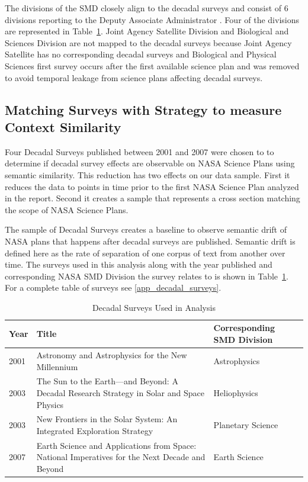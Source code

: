 \documentclass[preprint,12pt]{elsarticle}
\begin{document}
 The divisions of the SMD closely align to the decadal surveys and consist of 6 divisions reporting to the Deputy Associate Administrator \cite{NASA_SMD}. Four of the divisions are represented in Table~\ref{tab:decadals_used}. Joint Agency Satellite Division and Biological and Sciences Division are not mapped to the decadal surveys because Joint Agency Satellite has no corresponding decadal surveys and Biological and Physical Sciences first survey occurs after the first available science plan and was removed to avoid temporal leakage from science plans affecting decadal surveys.  

\subsection{Matching Surveys with Strategy to measure Context Similarity}
Four Decadal Surveys published between 2001 and 2007 were chosen to to determine if decadal survey effects are observable on NASA Science Plans using semantic similarity.  This reduction has two effects on our data sample. First it reduces the data to points in time prior to the first NASA Science Plan analyzed in the report. Second it creates a sample that represents a cross section matching the scope of NASA Science Plans. 

The sample of Decadal Surveys creates a baseline to observe semantic drift of NASA plans that happens after decadal surveys are published. Semantic drift is defined here as the rate of separation of one corpus of text from another over time. The surveys used in this analysis along with the year published and corresponding NASA SMD Division the survey relates to is shown in Table~\ref{tab:decadals_used}. For a complete table of surveys see \ref{app_decadal_surveys}.

\begin{table}[H]
\centering
\begin{tabular}{p{1.2cm} p{7.5cm} p{3.5cm}}
 \hline
 \rowcolor[gray]{0.95}
 \textbf{Year} & \textbf{Title} & \textbf{Corresponding SMD Division} \\ \hline
 2001 & Astronomy and Astrophysics for the New Millennium & Astrophysics \\
 \rowcolor[gray]{0.97}
 2003 & The Sun to the Earth—and Beyond: A Decadal Research Strategy in Solar and Space Physics & Heliophysics \\
 2003 & New Frontiers in the Solar System: An Integrated Exploration Strategy & Planetary  Science \\
 \rowcolor[gray]{0.97}
 2007 & Earth Science and Applications from Space: National Imperatives for the Next Decade and Beyond & Earth Science \\
\end{tabular}
\caption{Decadal Surveys Used in Analysis \cite{Academies_decadal, NASA_sci_strat}}\label{tab:decadals_used}
\end{table}
\end{document}
